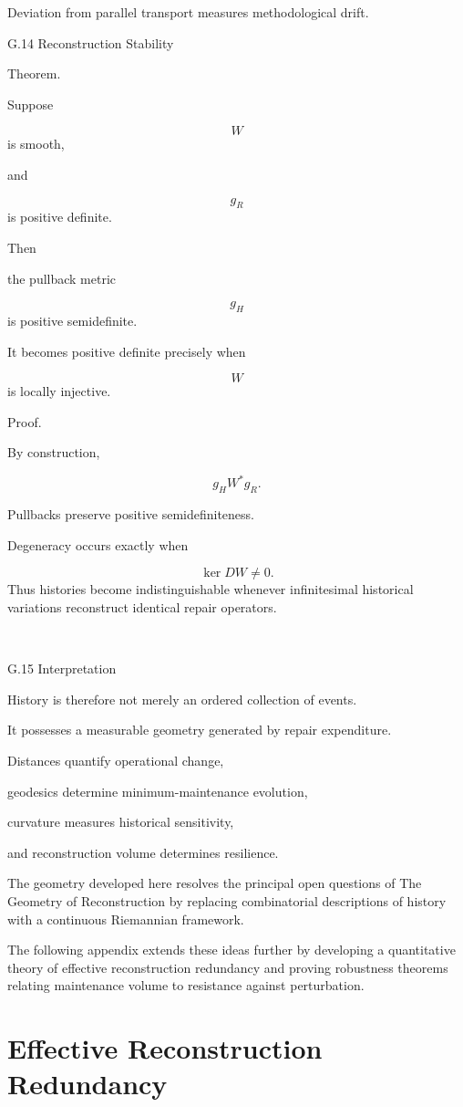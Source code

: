 \documentclass[12pt,oneside]{article}
\theoremstyle{plain}
\theoremstyle{definition}
\theoremstyle{remark}
\begin{document}
Deviation from parallel transport measures methodological drift.


G.14 Reconstruction Stability

Theorem.

Suppose

\[
W
\]
is smooth,

and

\[
g_R
\]
is positive definite.

Then

the pullback metric

\[
g_H
\]
is positive semidefinite.

It becomes positive definite precisely when

\[
W
\]
is locally injective.

Proof.

By construction,

\[
g_H
W^*g_R.
\]

Pullbacks preserve positive semidefiniteness.

Degeneracy occurs exactly when

\[
\ker DW
\neq0.
\]
Thus histories become indistinguishable whenever infinitesimal historical variations reconstruct identical repair operators.

\square


G.15 Interpretation

History is therefore not merely an ordered collection of events.

It possesses a measurable geometry generated by repair expenditure.

Distances quantify operational change,

geodesics determine minimum-maintenance evolution,

curvature measures historical sensitivity,

and reconstruction volume determines resilience.

The geometry developed here resolves the principal open questions of The Geometry of Reconstruction by replacing combinatorial descriptions of history with a continuous Riemannian framework.

The following appendix extends these ideas further by developing a quantitative theory of effective reconstruction redundancy and proving robustness theorems relating maintenance volume to resistance against perturbation.

\section{Effective Reconstruction Redundancy}
\end{document}
